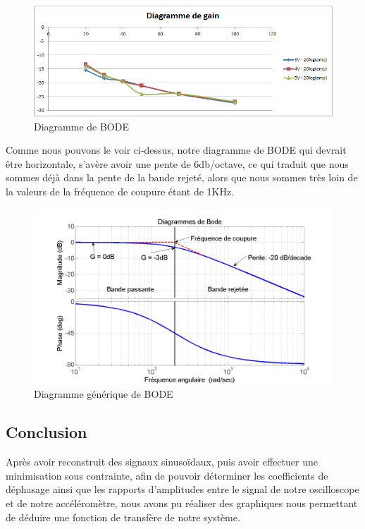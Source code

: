 \documentclass[french,a4paper,12pt]{report}
\begin{document}
	\begin{figure}[!ht]
    \center
  	\includegraphics[width=15cm]{baud.png}
    \caption{Diagramme de BODE}
	\end{figure}	
	
	Comme nous pouvons le voir ci-dessus, notre diagramme de BODE qui devrait être horizontale, s'avère avoir une pente de 6db/octave, ce qui traduit que nous sommes déjà dans la pente de la bande rejeté, alors que nous sommes très loin de la valeurs de la fréquence de coupure étant de 1KHz.
	
	\begin{figure}[!ht]
    \center
  	\includegraphics[width=15cm]{bode.png}
    \caption{Diagramme générique de BODE}
	\end{figure}
	
\newpage	
	
		\subsection{Conclusion}
			Après avoir reconstruit des signaux sinusoïdaux, puis avoir effectuer une minimisation sous contrainte, afin de pouvoir déterminer les coefficients de déphasage ainsi que les rapports d'amplitudes entre le signal de notre oscilloscope et de notre accéléromètre, nous avons pu réaliser des graphiques nous permettant de déduire une fonction de transfère de notre système.
			
\end{document}

